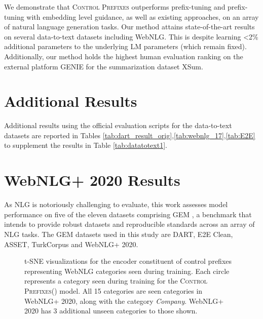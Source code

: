 \documentclass[11pt]{article}
\newcommand{\control}{\textsc{Control Prefixes}\xspace}
\begin{document}
We demonstrate that \control outperforms prefix-tuning and prefix-tuning with embedding level guidance, as well as existing approaches, on an
array of natural language generation tasks. Our method attains state-of-the-art results on several data-to-text datasets including WebNLG. This is despite learning <2\% additional parameters to the underlying LM parameters (which remain fixed).  
Additionally, our method holds the highest human evaluation ranking on the external platform GENIE for the summarization dataset XSum. 

\clearpage









\clearpage

\appendix
\label{sec:appendix}




\section{Additional Results}

\label{app:addition}
Additional results using the official evaluation scripts for the data-to-text datasets are reported in Tables \ref{tab:dart_result_orig},\ref{tab:webnlg_17},\ref{tab:E2E} to supplement the results in Table \ref{tab:datatotext1}. 




\section{WebNLG+ 2020 Results}
\label{app:web2020}

As NLG is notoriously challenging to evaluate, this work assesses model performance on five of the eleven datasets comprising GEM \citep{gem}, a benchmark that intends to provide robust datasets and 
reproducible standards across an array of NLG tasks. The GEM datasets used in this study are DART, E2E Clean, ASSET, TurkCorpus and WebNLG+ 2020. 

\begin{figure}[h]
    \centering
    \qquad
    \caption{t-SNE visualizations for the encoder constituent of control prefixes representing WebNLG categories seen during training. Each circle represents a category seen during training for the \control () model.  All 15 categories are seen categories in WebNLG+ 2020, along with the
category \emph{Company}. WebNLG+ 2020 has 3 additional unseen categories to those shown.}\label{fig:web_cats_tsne}\end{figure}
\end{document}
